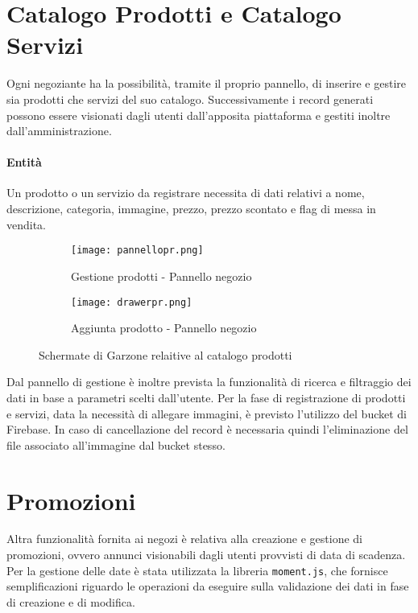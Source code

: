 \section{Catalogo Prodotti e Catalogo Servizi}
Ogni negoziante ha la possibilità, tramite il proprio pannello, di inserire e gestire sia prodotti che servizi del suo catalogo. Successivamente i record generati possono essere visionati dagli utenti dall'apposita piattaforma e gestiti inoltre dall'amministrazione.
\paragraph{Entità} Un prodotto o un servizio da registrare necessita di dati relativi a nome, descrizione, categoria, immagine, prezzo, prezzo scontato e flag di messa in vendita.
\begin{figure}[h!]
    \begin{subfigure}{0.5\textwidth}
    \texttt{[image: pannellopr.png]} 
    \caption{Gestione prodotti - Pannello negozio}
    \label{fig:subim1}
    \end{subfigure}
    \begin{subfigure}{0.5\textwidth}
    \texttt{[image: drawerpr.png]}
    \caption{Aggiunta prodotto - Pannello negozio}
    \label{fig:subim2}
    \end{subfigure}
    
    \caption{Schermate di Garzone relaitive al catalogo prodotti}
    \label{fig:image2}
\end{figure}
\FloatBarrier
Dal pannello di gestione è inoltre prevista la funzionalità di ricerca e filtraggio dei dati in base a parametri scelti dall'utente. Per la fase di registrazione di prodotti e servizi, data la necessità di allegare immagini, è previsto l'utilizzo del bucket di Firebase. In caso di cancellazione del record è necessaria quindi l'eliminazione del file associato all'immagine dal bucket stesso.
\section{Promozioni}
Altra funzionalità fornita ai negozi è relativa alla creazione e gestione di promozioni, ovvero annunci visionabili dagli utenti provvisti di data di scadenza. Per la gestione delle date è stata utilizzata la libreria \lstinline[basicstyle=\ttfamily]!moment.js!, che fornisce semplificazioni riguardo le operazioni da eseguire sulla validazione dei dati in fase di creazione e di modifica.
